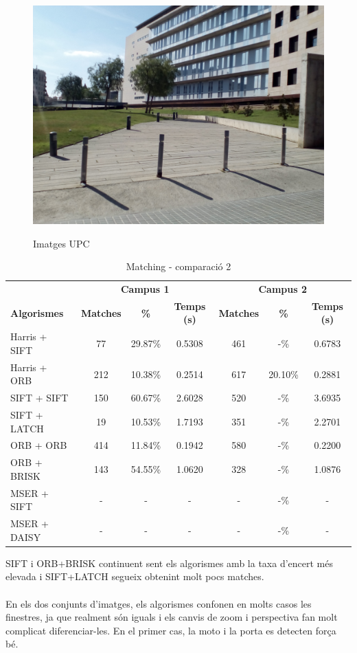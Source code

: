 \begin{figure}[!htb]
				\label{fig:awesome_image3}
			\endminipage\hfill
				\includegraphics[width=\linewidth]{images/experiments/uni4}
				\label{fig:awesome_image3}
			\endminipage
			\caption{Imatges UPC}
		\end{figure}

		\begin{table}[H]
			\begin{center}
				\begin{tabular}{l | c c c | c c c}
					& \multicolumn{3}{c|}{\textbf{Campus 1}} & \multicolumn{3}{c}{\textbf{Campus 2}} \\
					\textbf{Algorismes} & \textbf{Matches} & \textbf{\%} & \textbf{Temps (s)} & \textbf{Matches} & \textbf{\%} & \textbf{Temps (s)} \\ \hline
					Harris + SIFT & 77 & 29.87\% & 0.5308 & 461 & -\% & 0.6783 \\
					Harris + ORB & 212 & 10.38\% & 0.2514 & 617 & 20.10\% & 0.2881 \\
					SIFT + SIFT & 150 & 60.67\% & 2.6028 & 520 & -\% & 3.6935 \\
					SIFT + LATCH & 19 & 10.53\% & 1.7193 & 351 & -\% & 2.2701 \\
					ORB + ORB & 414 & 11.84\% & 0.1942 & 580 & -\% & 0.2200 \\
					ORB + BRISK & 143 & 54.55\% & 1.0620 & 328 & -\% & 1.0876 \\
					MSER + SIFT & - & - & - & - & -\% & - \\
					MSER + DAISY & - & - & - & - & -\% & - \\
				\end{tabular}
			\end{center}
			\caption{Matching - comparació 2}
		\end{table}
		\noindent
		SIFT i ORB+BRISK continuent sent els algorismes amb la taxa d'encert més elevada i SIFT+LATCH segueix obtenint molt pocs matches.\\\\
		En els dos conjunts d'imatges, els algorismes confonen en molts casos
		les finestres, ja que realment són iguals i els canvis de zoom i perspectiva fan molt complicat diferenciar-les. En el primer cas, la moto i la porta es detecten força bé.

